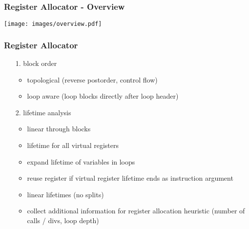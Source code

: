 \documentclass[navbaroff,en]{sdqbeamer}
\begin{document}
\begin{frame}
\frametitle{Register Allocator - Overview}

\centering \texttt{[image: images/overview.pdf]}

\end{frame}

\begin{frame}
    \frametitle{Register Allocator}

    \begin{itemize}
        \item[1.] block order
        \begin{itemize}
            \item topological (reverse postorder, control flow)
            \item loop aware (loop blocks directly after loop header)
        \end{itemize}
        \item[2.] lifetime analysis
        \begin{itemize}
            \item linear through blocks
            \item lifetime for all virtual registers
            \item expand lifetime of variables in loops
            \item reuse register if virtual register lifetime ends as instruction argument
            \item linear lifetimes (no splits)
            \item collect additional information for register allocation heuristic (number of calls / divs, loop depth)
        \end{itemize}
    \end{itemize}

\end{frame}
\end{document}
